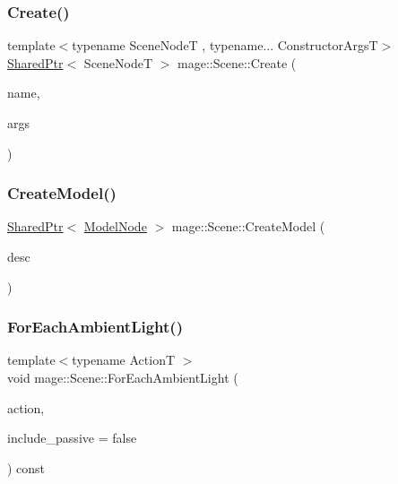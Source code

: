 \subsubsection{\texorpdfstring{Create()}{Create()}}
{\footnotesize\ttfamily template$<$typename Scene\+NodeT , typename... Constructor\+ArgsT$>$ \\
\hyperlink{namespacemage_a1e01ae66713838a7a67d30e44c67703e}{Shared\+Ptr}$<$ Scene\+NodeT $>$ mage\+::\+Scene\+::\+Create (\begin{DoxyParamCaption}\item[{const string \&}]{name,  }\item[{Constructor\+ArgsT \&\&...}]{args }\end{DoxyParamCaption})}

\hypertarget{classmage_1_1_scene_a9d6c27c761cd4535549c8af2e3804b7d}{}\label{classmage_1_1_scene_a9d6c27c761cd4535549c8af2e3804b7d} 
\subsubsection{\texorpdfstring{Create\+Model()}{CreateModel()}}
{\footnotesize\ttfamily \hyperlink{namespacemage_a1e01ae66713838a7a67d30e44c67703e}{Shared\+Ptr}$<$ \hyperlink{classmage_1_1_model_node}{Model\+Node} $>$ mage\+::\+Scene\+::\+Create\+Model (\begin{DoxyParamCaption}\item[{const \hyperlink{classmage_1_1_model_descriptor}{Model\+Descriptor} \&}]{desc }\end{DoxyParamCaption})}

\hypertarget{classmage_1_1_scene_a0b05bd65003dfb02124dd00762950a16}{}\label{classmage_1_1_scene_a0b05bd65003dfb02124dd00762950a16} 
\subsubsection{\texorpdfstring{For\+Each\+Ambient\+Light()}{ForEachAmbientLight()}}
{\footnotesize\ttfamily template$<$typename ActionT $>$ \\
void mage\+::\+Scene\+::\+For\+Each\+Ambient\+Light (\begin{DoxyParamCaption}\item[{ActionT}]{action,  }\item[{bool}]{include\+\_\+passive = {\ttfamily false} }\end{DoxyParamCaption}) const}

